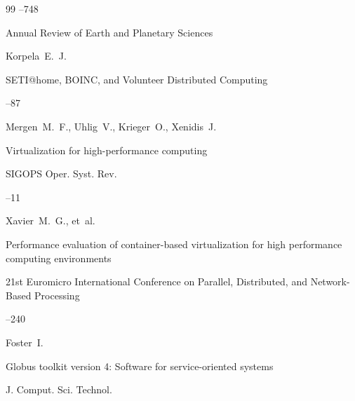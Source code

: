 \begin{thebibliography}{99}
--748






\jour  Annual Review of Earth and Planetary Sciences

\by Korpela~E.~J.

\paper SETI@home, BOINC, and Volunteer Distributed Computing




--87







\by Mergen~M.~F., Uhlig~V., Krieger~O., Xenidis~J.

\paper Virtualization for  high-performance computing

\jour  SIGOPS Oper. Syst. Rev. 




--11







\by Xavier~M.~G.,  et~al.


\paper Performance evaluation   of container-based virtualization for high performance computing   environments 

\inbook 21st Euromicro International Conference on Parallel, Distributed, and Network-Based Processing


--240






\by Foster~I.

\paper Globus toolkit version 4: Software for service-oriented   systems

\jour J. Comput. Sci. Technol.



\end{thebibliography}
